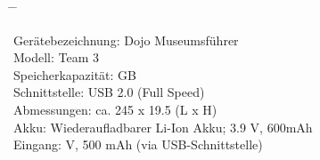 \begin{tabbing}

\hspace{40mm}		\= \hspace{15mm} \=\kill

Gerätebezeichnung:	\> Dojo Museumsführer \\[5mm]
Modell:				\> Team 3 \\[5mm]
Speicherkapazität:	 GB \\[5mm]
Schnittstelle:		\> USB 2.0 (Full Speed) \\[5mm]
Abmessungen:		\> ca. 245 x 19.5 (L x H) \\[5mm]
Akku:				\> Wiederaufladbarer Li-Ion Akku; 3.9 V, 600mAh \\[5mm]
Eingang:			 V, 500 mAh (via USB-Schnittstelle) \\[5mm]

\end{tabbing}